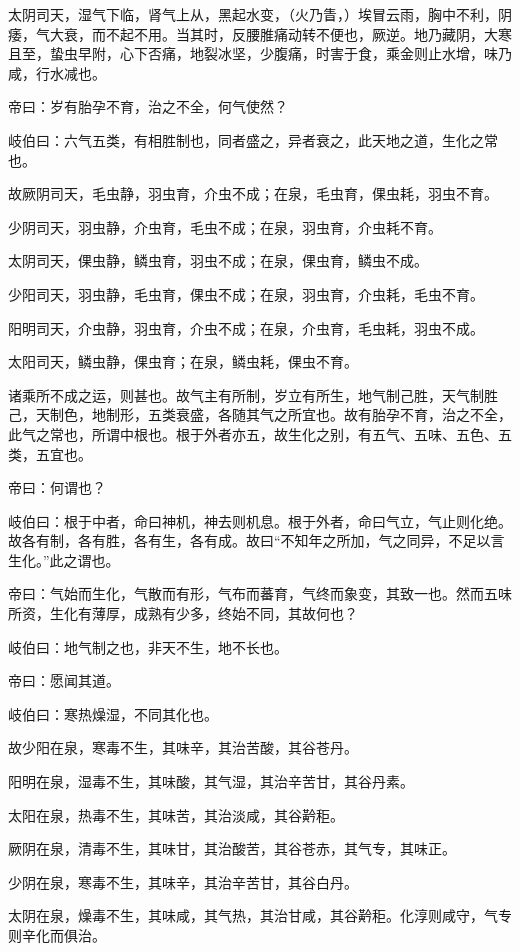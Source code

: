 \documentclass{article}%
\begin{document}
太阴司天，湿气下临，肾气上从，黑起水变，（火乃眚，）埃冒云雨，胸中不利，阴痿，气大衰，而不起不用。当其时，反腰脽痛动转不便也，厥逆。地乃藏阴，大寒且至，蛰虫早附，心下否痛，地裂冰坚，少腹痛，时害于食，乘金则止水增，味乃咸，行水减也。

帝曰：岁有胎孕不育，治之不全，何气使然？

岐伯曰：六气五类，有相胜制也，同者盛之，异者衰之，此天地之道，生化之常也。

故厥阴司天，毛虫静，羽虫育，介虫不成；在泉，毛虫育，倮虫耗，羽虫不育。

少阴司天，羽虫静，介虫育，毛虫不成；在泉，羽虫育，介虫耗不育。

太阴司天，倮虫静，鳞虫育，羽虫不成；在泉，倮虫育，鳞虫不成。

少阳司天，羽虫静，毛虫育，倮虫不成；在泉，羽虫育，介虫耗，毛虫不育。

阳明司天，介虫静，羽虫育，介虫不成；在泉，介虫育，毛虫耗，羽虫不成。

太阳司天，鳞虫静，倮虫育；在泉，鳞虫耗，倮虫不育。

诸乘所不成之运，则甚也。故气主有所制，岁立有所生，地气制己胜，天气制胜己，天制色，地制形，五类衰盛，各随其气之所宜也。故有胎孕不育，治之不全，此气之常也，所谓中根也。根于外者亦五，故生化之别，有五气、五味、五色、五类，五宜也。

帝曰：何谓也？

岐伯曰：根于中者，命曰神机，神去则机息。根于外者，命曰气立，气止则化绝。故各有制，各有胜，各有生，各有成。故曰“不知年之所加，气之同异，不足以言生化。”此之谓也。

帝曰：气始而生化，气散而有形，气布而蕃育，气终而象变，其致一也。然而五味所资，生化有薄厚，成熟有少多，终始不同，其故何也？

岐伯曰：地气制之也，非天不生，地不长也。

帝曰：愿闻其道。

岐伯曰：寒热燥湿，不同其化也。

故少阳在泉，寒毒不生，其味辛，其治苦酸，其谷苍丹。

阳明在泉，湿毒不生，其味酸，其气湿，其治辛苦甘，其谷丹素。

太阳在泉，热毒不生，其味苦，其治淡咸，其谷黅秬。

厥阴在泉，清毒不生，其味甘，其治酸苦，其谷苍赤，其气专，其味正。

少阴在泉，寒毒不生，其味辛，其治辛苦甘，其谷白丹。

太阴在泉，燥毒不生，其味咸，其气热，其治甘咸，其谷黅秬。化淳则咸守，气专则辛化而俱治。
\end{document}

